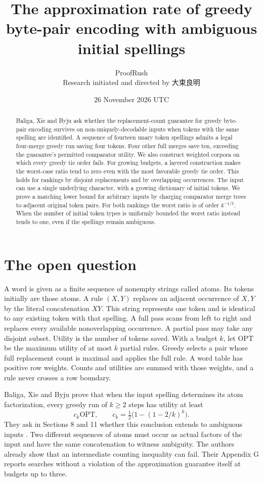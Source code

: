 \documentclass[11pt]{article}
\title{The approximation rate of greedy byte-pair encoding with ambiguous initial spellings}
\author{ProofRush\\[2pt]\small Research initiated and directed by {\namefont 大束良明}}
\date{26 November 2026 UTC}
\newcommand{\OPT}{\mathrm{OPT}}
\begin{document}
\maketitle

\begin{abstract}
Baliga, Xie and Byju ask whether the replacement-count guarantee for greedy byte-pair encoding survives on non-uniquely-decodable inputs when tokens with the same spelling are identified. A sequence of fourteen unary token spellings admits a legal four-merge greedy run saving four tokens. Four other full merges save ten, exceeding the guarantee's permitted comparator utility. We also construct weighted corpora on which every greedy tie order fails. For growing budgets, a layered construction makes the worst-case ratio tend to zero even with the most favorable greedy tie order. This holds for rankings by disjoint replacements and by overlapping occurrences. The input can use a single underlying character, with a growing dictionary of initial tokens. We prove a matching lower bound for arbitrary inputs by charging comparator merge trees to adjacent original token pairs. For both rankings the worst ratio is of order $k^{-1/2}$. When the number of initial token types is uniformly bounded the worst ratio instead tends to one, even if the spellings remain ambiguous.
\end{abstract}

\section{The open question}
A word is given as a finite sequence of nonempty strings called atoms. Its tokens initially are those atoms. A rule $(X,Y)$ replaces an adjacent occurrence of $X,Y$ by the literal concatenation $XY$. This string represents one token and is identical to any existing token with that spelling. A full pass scans from left to right and replaces every available nonoverlapping occurrence. A partial pass may take any disjoint subset. Utility is the number of tokens saved. With a budget $k$, let $\OPT$ be the maximum utility of at most $k$ partial rules. Greedy selects a pair whose full replacement count is maximal and applies the full rule. A word table has positive row weights. Counts and utilities are summed with those weights, and a rule never crosses a row boundary.

Baliga, Xie and Byju prove that when the input spelling determines its atom factorization, every greedy run of $k\ge2$ steps has utility at least
\[
c_k\OPT,\qquad c_k=\tfrac12\bigl(1-(1-2/k)^k\bigr).
\]
They ask in Sections 8 and 11 whether this conclusion extends to ambiguous inputs \cite{bxb}. Two different sequences of atoms must occur as actual factors of the input and have the same concatenation to witness ambiguity. The authors already show that an intermediate counting inequality can fail. Their Appendix G reports searches without a violation of the approximation guarantee itself at budgets up to three.
\end{document}

